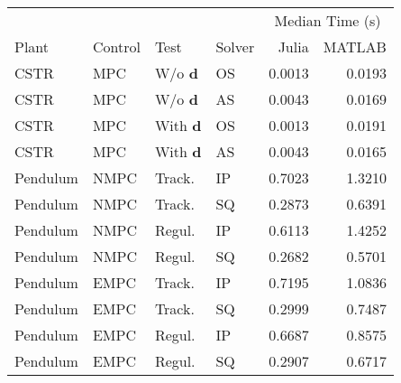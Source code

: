 \begin{tabular}{llllrr}
	
\toprule %

	  &	& & & \multicolumn{2}{c}{Median Time (s)} \\ \cmidrule(l){5-6}
Plant & Control & Test & Solver & Julia & MATLAB \\
\midrule %

CSTR		& MPC	& W/o $\mathbf{d}$	& OS & \num{0.0013} & \num{0.0193}	\\
CSTR		& MPC	& W/o $\mathbf{d}$	& AS & \num{0.0043} & \num{0.0169}	\\
CSTR		& MPC	& With $\mathbf{d}$ & OS & \num{0.0013} & \num{0.0191}	\\
CSTR		& MPC	& With $\mathbf{d}$ & AS & \num{0.0043} & \num{0.0165}	\\
Pendulum 	& NMPC	& Track. 	   		& IP & \num{0.7023} & \num{1.3210}	\\
Pendulum 	& NMPC	& Track. 	   		& SQ & \num{0.2873} & \num{0.6391}	\\
Pendulum    & NMPC	& Regul. 			& IP & \num{0.6113} & \num{1.4252} 	\\
Pendulum    & NMPC	& Regul. 			& SQ & \num{0.2682} & \num{0.5701} 	\\
Pendulum    & EMPC	& Track.			& IP & \num{0.7195} & \num{1.0836} 	\\
Pendulum    & EMPC	& Track.			& SQ & \num{0.2999} & \num{0.7487} 	\\
Pendulum	& EMPC	& Regul. 			& IP & \num{0.6687} & \num{0.8575} 	\\
Pendulum	& EMPC	& Regul. 			& SQ & \num{0.2907} & \num{0.6717}  \\
	
\bottomrule %
	
\end{tabular}